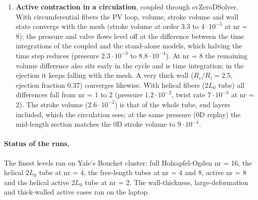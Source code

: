 \begin{enumerate}
tube is free of this (Section~\ref{sec:helical}), and there every quantity converges to the
0D block: for the $\pm60^\circ$ helix of the test case at nr = 4 to $1.7\cdot10^{-4}$ in the
volume and $9\cdot10^{-4}$ in $\rho$ (order 2.8). With a large twist the twist rate agrees to
$3\cdot10^{-3}$ (uniform $30^\circ$ helix) and $2\cdot10^{-4}$ (helix from $+60^\circ$ to
$0^\circ$) at nr = 2, converging at about fourth order. The $\pm60^\circ$ helix twists very
little (the torques of its two fiber layers almost cancel), so its relative twist error is
larger and converges late: 15\%, 8\% and 1.6\% at nr = 1, 2, 4.
\item \textbf{Active contraction in a circulation}, coupled through svZeroDSolver. With
circumferential fibers the PV loop, volume, stroke volume and wall state converge with the
mesh (stroke volume at order 3.3 to $4\cdot10^{-5}$ at nr = 8); the pressure and valve flows
level off at the difference between the time integrations of the coupled and the
stand-alone models, which halving the time step reduces (pressure $2.3\cdot10^{-3}$ to
$8.8\cdot10^{-4}$). At nr = 8 the remaining volume difference also sits early in the cycle
and is time integration; in the ejection it keeps falling with the mesh. A very thick wall
($R_e/R_i = 2.5$, ejection fraction 0.37) converges likewise. With helical fibers ($2L_0$
tube) all differences fall from nr = 1 to 2 (pressure $1.2\cdot10^{-2}$, twist rate
$7\cdot10^{-3}$ at nr = 2). The stroke volume ($2.6\cdot10^{-2}$) is that of the whole tube,
end layers included, which the circulation sees; at the same pressure (0D replay) the
mid-length section matches the 0D stroke volume to $9\cdot10^{-4}$.
\end{enumerate}

\paragraph{Status of the runs.} The finest levels ran on Yale's Bouchet cluster: full
Holzapfel-Ogden nr = 16, the helical $2L_0$ tube at nr = 4, the free-length tubes at
nr = 4 and 8, active nr = 8 and the helical active $2L_0$ tube at nr = 2. The wall-thickness, large-deformation and thick-walled active
cases ran on the laptop.

